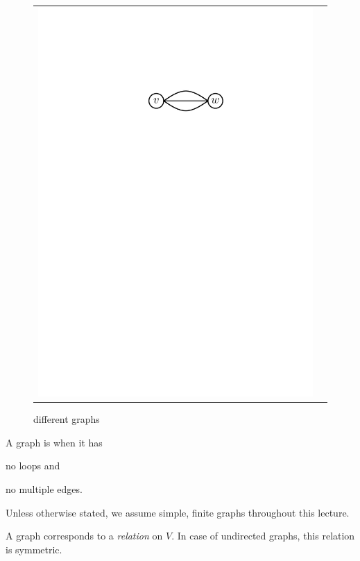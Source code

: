 \begin{figure}[htb]
\begin{tabular}{c c}
{	\includegraphics[scale=.5]{01_graph_theory/pics/graph_multiple-edges.pdf}
}
\end{tabular}
\caption{different graphs}
\end{figure}
\FloatBarrier

\begin{definition}
A graph is  when it has
\begin{compactitem}
\item no loops and
\item no multiple edges.
\end{compactitem}
\end{definition}

Unless otherwise stated, we assume simple, finite graphs throughout this
lecture.

A graph corresponds to a \emph{relation} on $V$. In case of undirected graphs,
this relation is symmetric.


